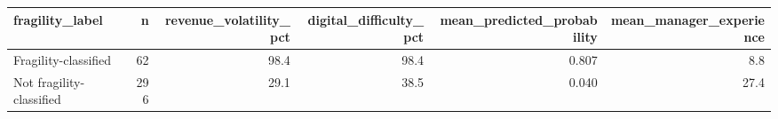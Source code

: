 \begin{tabular}{lrrrrr}
\toprule
fragility\_label & n & revenue\_volatility\_pct & digital\_difficulty\_pct & mean\_predicted\_probability & mean\_manager\_experience \\
\midrule
Fragility-classified & 62 & 98.4 & 98.4 & 0.807 & 8.8 \\
Not fragility-classified & 296 & 29.1 & 38.5 & 0.040 & 27.4 \\
\bottomrule
\end{tabular}
